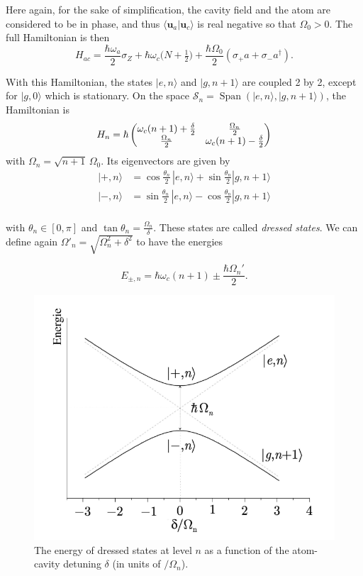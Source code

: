 \documentclass[10pt,a4paper]{report}
\theoremstyle{plain}
\theoremstyle{definition}
\theoremstyle{remark}
\newcommand{\ket}[1]{|#1\rangle}
\newcommand{\braket}[2]{\langle#1|#2\rangle}
\newcommand{\mat}[1]{\begin{pmatrix}#1\end{pmatrix}}
\newcommand{\bs}{\boldsymbol}
\DeclareMathOperator{\Span}{Span}
\newcommand{\twoline}{\vphantom{\frac\int\int}}
\begin{document}
Here again, for the sake of simplification, the cavity field and the atom are
considered to be in phase, and thus $\braket{\bs u_a}{\bs u_c}$ is real
negative so that $\Omega_0 > 0$. The full Hamiltonian is then
\begin{equation}
H_{ac} = \frac{\hbar \omega_a}2 \sigma_Z + \hbar \omega_c \big(N +
  \tfrac12\big) + \frac{\hbar \Omega_0}2 (\sigma_+a + \sigma_-a^\dagger).
\end{equation}

With this Hamiltonian, the states $\ket{e,n}$ and $\ket{g,n+1}$ are coupled 2 by
2, except for $\ket{g,0}$ which is stationary. On the space $\mathcal{S}_n =
\Span(\ket{e,n},\ket{g,n+1})$, the Hamiltonian is
\[\twoline H_n = \hbar \mat{\omega_c(n+1) + \frac{\delta}2& \frac{\Omega_n}2\\
    \frac{\Omega_n}2&\omega_c(n+1) - \frac{\delta}2}\]
with $\Omega_n = \sqrt{n+1} \,\Omega_0$. Its eigenvectors are given by
\newcommand{\tnt}{\frac{\theta_n}2}
\begin{align*}
  \ket{+,n} &= \cos \tnt \,\ket{e,n} + \sin \tnt \ket{g,n+1}\\
  \ket{-,n} &= \sin \tnt \,\ket{e,n} - \cos \tnt \ket{g,n+1}\\
\end{align*}

\vspace{-0.5cm}

with $\theta_n \in [0,\pi]$ and $\tan \theta_n = \frac {\Omega_n}{\delta}$.
These states are called \emph{dressed states}.
We can define again $\Omega'_n = \sqrt{\Omega_n^2 + \delta^2}$ to have the energies

\vspace{-0.2cm}

\[E_{\pm,n} = \hbar \omega_c(n+1) \pm \frac{\hbar \Omega_n'}2.\]

\vspace{0.2cm}

\begin{figure}
  \centering
  \includegraphics[scale=0.3]{dressed.png}
  \caption{The energy of dressed states at level $n$ as a function of the atom-cavity detuning $\delta$ (in units of $/\Omega_n$).}
  \label{fig:dressedenergy}
\end{figure}
\end{document}
